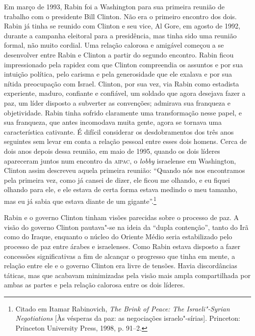 Em março de 1993, Rabin foi a Washington para sua primeira reunião de
trabalho com o presidente Bill Clinton. Não era o primeiro encontro dos
dois. Rabin já tinha se reunido com Clinton e seu vice, Al Gore, em
agosto de 1992, durante a campanha eleitoral para a presidência, mas
tinha sido uma reunião formal, não muito cordial. Uma relação calorosa e
amigável começou a se desenvolver entre Rabin e Clinton a partir do
segundo encontro. Rabin ficou impressionado pela rapidez com que Clinton
compreendia os assuntos e por sua intuição política, pelo carisma e pela
generosidade que ele exalava e por sua nítida preocupação com Israel.
Clinton, por sua vez, via Rabin como estadista experiente, maduro,
confiante e confiável, um soldado que agora desejava fazer a paz, um
líder disposto a subverter as convenções; admirava sua franqueza e
objetividade. Rabin tinha sofrido claramente uma transformação nesse
papel, e sua franqueza, que antes incomodava muita gente, agora se
tornava uma característica cativante. É difícil considerar os
desdobramentos dos três anos seguintes sem levar em conta a relação
pessoal entre esses dois homens. Cerca de dois anos depois dessa
reunião, em maio de 1995, quando os dois líderes apareceram juntos num
encontro da \textsc{aipac}, o \emph{lobby} israelense em Washington, Clinton assim
descreveu aquela primeira reunião: ``Quando nós nos encontramos pela
primeira vez, como já cansei de dizer, ele ficou me olhando, e eu fiquei
olhando para ele, e ele estava de certa forma estava medindo o meu
tamanho, mas eu já sabia que estava diante de um gigante''.\footnote{Citado
  em Itamar Rabinovich, \emph{The Brink of Peace: The Israeli"-Syrian
  Negotiations} {[}Às vésperas da paz: as negociações israelo"-sírias{]}. Princeton: Princeton University Press, 1998, p. 91--2.}

Rabin e o governo Clinton tinham visões parecidas sobre o processo de
paz. A visão do governo Clinton pautava"-se na ideia da ``dupla
contenção'', tanto do Irã como do Iraque, enquanto o núcleo do Oriente
Médio seria estabilizado pelo processo de paz entre árabes e
israelenses. Como Rabin estava disposto a fazer concessões
significativas a fim de alcançar o progresso que tinha em mente, a
relação entre ele e o governo Clinton era livre de tensões. Havia
discordâncias táticas, mas que acabavam minimizadas pela visão mais
ampla compartilhada por ambas as partes e pela relação calorosa entre os
dois líderes.

